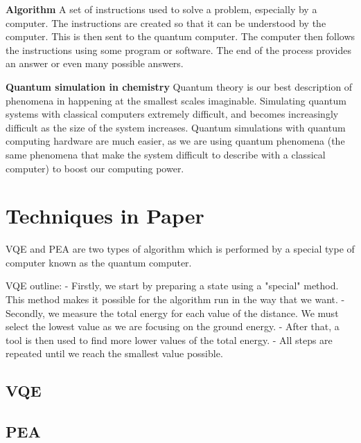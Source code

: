 \documentclass[14pt,landscape,color=UCLdarkred,margin=3cm]{uclposter}
\begin{document}
\begin{multicols}{3}
\begin{highlightbox}
\textbf{Algorithm} A set of instructions used to solve a problem, especially by a computer. The instructions are created so that it can be understood by the computer. This is then sent to the quantum computer. The computer then follows the instructions using some program or software. The end of the process provides an answer or even many possible answers.
\end{highlightbox}

\begin{highlightbox}
\textbf{Quantum simulation in chemistry} Quantum theory is our best description of phenomena in happening at the smallest scales imaginable. Simulating quantum systems with classical computers extremely difficult, and becomes increasingly difficult as the size of the system increases. Quantum simulations with quantum computing hardware are much easier, as we are using quantum phenomena (the same phenomena that make the system difficult to describe with a classical computer) to boost our computing power.
\end{highlightbox}

\columnbreak

\section*{Techniques in Paper}
VQE and PEA are two types of algorithm which is performed by a special type of computer known as the quantum computer.

VQE outline:
- Firstly, we start by preparing a state using a "special" method. This method makes it possible for the algorithm run in the way that we want.
- Secondly, we measure the total energy for each value of the distance. We must select the lowest value as we are focusing on the ground energy.
- After that, a tool is then used to find more lower values of the total energy.
- All steps are repeated until we reach the smallest value possible.
\subsection*{VQE}

\subsection*{PEA}



\end{multicols}
\end{document}
